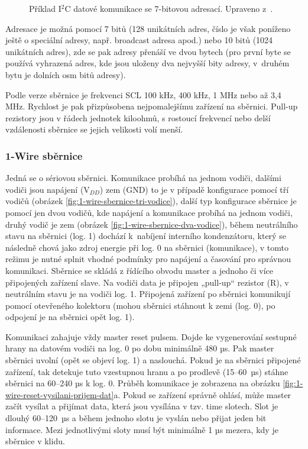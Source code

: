 \begin{figure}[H]
    \centering
    \def\svgwidth{\columnwidth}
    
    \caption{Příklad I$^2$C datové komunikace se 7-bitovou adresací. Upraveno z~\cite{i2c-sbernice-datovy-paket-7bit-adresa}.}
    \label{fig:i2c-sbernice-datova-komunikace-7bit-adresa}
\end{figure}

Adresace je možná pomocí 7 bitů (128 unikátních adres, číslo je však poníženo ještě o speciální adresy, např. broadcast adresa apod.) nebo 10 bitů (1024 unikátních adres), zde se pak adresy přenáší ve dvou bytech (pro první byte se používá vyhrazená adres, kde jsou uloženy dva nejvyšší bity adresy, v~druhém bytu je dolních osm bitů adresy).

Podle verze sběrnice je frekvenci SCL 100 kHz, 400 kHz, 1 MHz nebo až 3,4 MHz. Rychlost je pak přizpůsobena nejpomalejšímu zařízení na sběrnici. Pull-up rezistory jsou v řádech jednotek kiloohmů, s rostoucí frekvencí nebo delší vzdálenosti sběrnice se jejich velikosti volí menší.




\subsubsection{1-Wire sběrnice}
Jedná se o sériovou sběrnici. Komunikace probíhá na jednom vodiči, dalšími vodiči jsou napájení (V$_{DD}$) zem (GND) to je v případě konfigurace pomocí tří vodičů (obrázek \ref{fig:1-wire-sbernice-tri-vodice}), další typ konfigurace sběrnice je pomocí jen dvou vodičů, kde napájení a komunikace probíhá na jednom vodiči, druhý vodič je zem (obrázek \ref{fig:1-wire-sbernice-dva-vodice}), během neutrálního stavu na sběrnici (log. 1) dochází k~nabíjení interního kondenzátoru, který se následně chová jako zdroj energie při log. 0 na sběrnici (komunikace), v tomto režimu je nutné splnit vhodné podmínky pro napájení a časování pro správnou komunikaci. Sběrnice se skládá z řídícího obvodu master a jednoho či více připojených zařízení slave. Na vodiči data je připojen „pull-up“ rezistor (R), v neutrálním stavu je na vodiči log. 1. Připojená zařízení po sběrnici komunikují pomocí otevřeného kolektoru (mohou sběrnici stáhnout k zemi (log. 0), po odpojení je na sběrnici opět log. 1).

Komunikaci zahajuje vždy master reset pulsem. Dojde ke vygenerování sestupné hrany na datovém vodiči na log. 0 po dobu minimálně 480 µs. Pak master sběrnici uvolní (opět se objeví log. 1) a naslouchá. Pokud je na sběrnici připojené zařízení, tak detekuje tuto vzestupnou hranu a po prodlevě (15–60~µs) stáhne sběrnici na 60–240 µs k log. 0. Průběh komunikace je zobrazena na obrázku \ref{fig:1-wire-reset-vysilani-prijem-dat}a. Pokud se zařízení správně ohlásí, může master začít vysílat a přijímat data, která jsou vysílána v tzv. time slotech. Slot je dlouhý 60–120~µs a během jednoho slotu je vyslán nebo přijat jeden bit informace. Mezi jednotlivými sloty musí být minimálně 1 µs mezera, kdy je sběrnice v klidu. 

